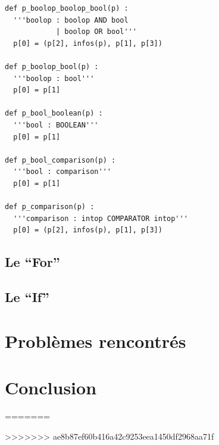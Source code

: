 \documentclass[10pt,a4paper]{article}
\begin{document}
\begin{lstlisting}
def p_boolop_boolop_bool(p) :
  '''boolop : boolop AND bool
            | boolop OR bool'''
  p[0] = (p[2], infos(p), p[1], p[3])

def p_boolop_bool(p) :
  '''boolop : bool'''
  p[0] = p[1]

def p_bool_boolean(p) :
  '''bool : BOOLEAN'''
  p[0] = p[1]

def p_bool_comparison(p) :
  '''bool : comparison'''
  p[0] = p[1]

def p_comparison(p) :
  '''comparison : intop COMPARATOR intop'''
  p[0] = (p[2], infos(p), p[1], p[3])
\end{lstlisting}

\subsection{Le ``For''}
\subsection{Le ``If''}
\section{Problèmes rencontrés}
\section{Conclusion}
=======
\usepackage[french]{babel}
\usepackage[T1]{fontenc}
\usepackage{graphicx}

\usepackage{fancyhdr}
\usepackage{vmargin}
>>>>>>> ae8b87ef60b416a42c9253eea1450df2968aa71f

\setlength{\parindent}{0cm}
\setlength{\parskip}{1ex plus 0.5ex minus 0.2ex}
\newcommand{\hsp}{\hspace{20pt}}
\newcommand{\HRule}{\rule{\linewidth}{0.5mm}}
\end{document}
